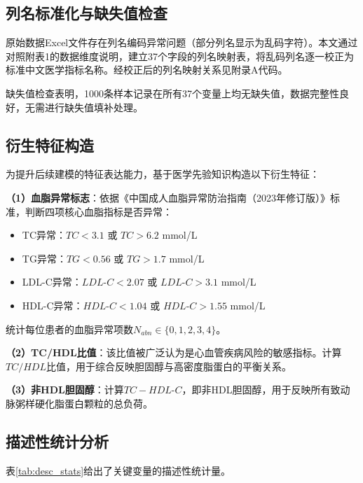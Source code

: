 \documentclass[12pt,a4paper]{ctexart}
\begin{document}
\subsection{列名标准化与缺失值检查}

原始数据Excel文件存在列名编码异常问题（部分列名显示为乱码字符）。本文通过对照附表1的数据维度说明，建立37个字段的列名映射表，将乱码列名逐一校正为标准中文医学指标名称。经校正后的列名映射关系见附录A代码。

缺失值检查表明，1000条样本记录在所有37个变量上均无缺失值，数据完整性良好，无需进行缺失值填补处理。

\subsection{衍生特征构造}

为提升后续建模的特征表达能力，基于医学先验知识构造以下衍生特征：

\textbf{（1）血脂异常标志}：依据《中国成人血脂异常防治指南（2023年修订版）》标准，判断四项核心血脂指标是否异常：
\begin{itemize}
    \item TC异常：$TC < 3.1$ 或 $TC > 6.2$ mmol/L
    \item TG异常：$TG < 0.56$ 或 $TG > 1.7$ mmol/L
    \item LDL-C异常：$LDL\text{-}C < 2.07$ 或 $LDL\text{-}C > 3.1$ mmol/L
    \item HDL-C异常：$HDL\text{-}C < 1.04$ 或 $HDL\text{-}C > 1.55$ mmol/L
\end{itemize}
统计每位患者的血脂异常项数$N_{abn} \in \{0,1,2,3,4\}$。

\textbf{（2）TC/HDL比值}：该比值被广泛认为是心血管疾病风险的敏感指标。计算$TC/HDL$比值，用于综合反映胆固醇与高密度脂蛋白的平衡关系。

\textbf{（3）非HDL胆固醇}：计算$TC - HDL\text{-}C$，即非HDL胆固醇，用于反映所有致动脉粥样硬化脂蛋白颗粒的总负荷。

\subsection{描述性统计分析}

表\ref{tab:desc_stats}给出了关键变量的描述性统计量。
\end{document}
